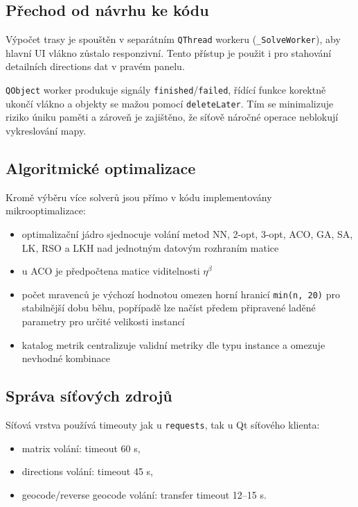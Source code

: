 \subsection{Přechod od návrhu ke kódu}
Výpočet trasy je spouštěn v separátním \texttt{QThread} workeru (\texttt{\_SolveWorker}), aby hlavní UI vlákno zůstalo responzivní. Tento přístup je použit i pro stahování detailních directions dat v pravém panelu.

\texttt{QObject} worker produkuje signály \texttt{finished}/\texttt{failed}, řídící funkce korektně ukončí vlákno a objekty se mažou pomocí \texttt{deleteLater}. Tím se minimalizuje riziko úniku paměti a zároveň je zajištěno, že síťově náročné operace neblokují vykreslování mapy.



\subsection{Algoritmické optimalizace}
Kromě výběru více solverů jsou přímo v kódu implementovány mikrooptimalizace:
\begin{itemize}
    \item optimalizační jádro sjednocuje volání metod NN, 2-opt, 3-opt, ACO, GA, SA, LK, RSO a LKH nad jednotným datovým rozhraním matice
    \item u ACO je předpočtena matice viditelnosti \(\eta^\beta\)
    \item počet mravenců je výchozí hodnotou omezen horní hranicí \texttt{min(n, 20)} pro stabilnější dobu běhu, popřípadě lze načíst předem připravené laděné parametry pro určité velikosti instancí
    \item katalog metrik centralizuje validní metriky dle typu instance a omezuje nevhodné kombinace
\end{itemize}

\subsection{Správa síťových zdrojů}
Síťová vrstva používá timeouty jak u \texttt{requests}, tak u Qt síťového klienta:
\begin{itemize}
    \item matrix volání: timeout 60 s,
    \item directions volání: timeout 45 s,
    \item geocode/reverse geocode volání: transfer timeout 12--15 s.
\end{itemize}

